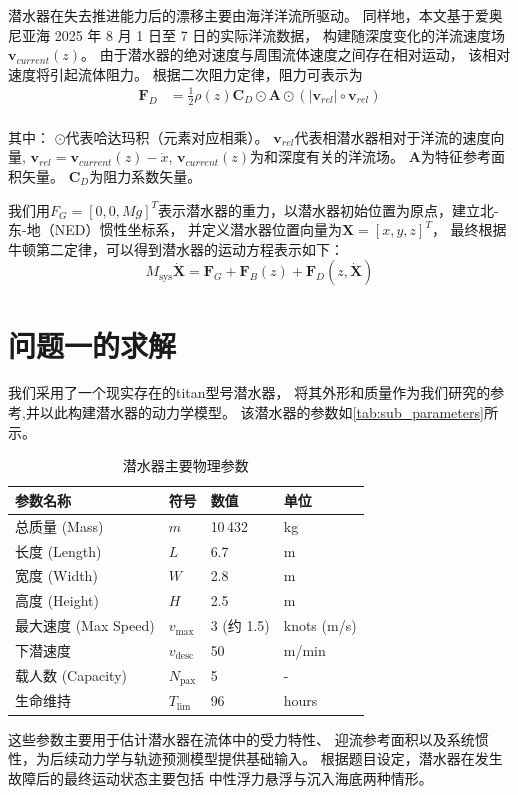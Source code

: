 \documentclass{mcmthesis}
\begin{document}
潜水器在失去推进能力后的漂移主要由海洋洋流所驱动。
同样地，本文基于爱奥尼亚海 2025 年 8 月 1 日至 7 日的实际洋流数据，
构建随深度变化的洋流速度场 $\bm{v}_{current}(z)$。
由于潜水器的绝对速度与周围流体速度之间存在相对运动，
该相对速度将引起流体阻力。
根据二次阻力定律，阻力可表示为
\begin{equation}
  \begin{matrix}\bm{F}_D&=\frac{1}{2}\rho(z)\mathbf{C}_D\odot\mathbf{A}\odot(|\mathbf{v}_{rel}|\circ\mathbf{v}_{rel})\\\end{matrix}
\end{equation}

其中：
$\odot$代表哈达玛积（元素对应相乘）。
$\mathbf{v}_{rel}$代表相潜水器相对于洋流的速度向量,
$\mathbf{v}_{rel}=\bm{v}_{current}(z)-\dot{x}$,
$\bm{v}_{current}(z)$为和深度有关的洋流场。
$\mathbf{A}$为特征参考面积矢量。
$\mathbf{C}_D$为阻力系数矢量。

我们用$F_G=[0,0,Mg]^T$表示潜水器的重力，以潜水器初始位置为原点，建立北-东-地（NED）惯性坐标系，
并定义潜水器位置向量为$\bm{X}=[x,y,z]^T$，
最终根据牛顿第二定律，可以得到潜水器的运动方程表示如下：
\begin{equation}
M_{\mathrm{sys}}\dot{\bm{X}} = \bm{F}_{G} + \bm{F}_{B}(z) + \bm{F}_{D}({z},\dot{\bm{X}}) 
\end{equation}


\section{问题一的求解}
我们采用了一个现实存在的titan型号潜水器，
将其外形和质量作为我们研究的参考,并以此构建潜水器的动力学模型。
该潜水器的参数如\autoref{tab:sub_parameters}所示。
\begin{table}[htbp]
\centering
\caption{潜水器主要物理参数}
\vspace{-0.4cm}
\label{tab:sub_parameters}
\begin{tabularx}{\linewidth}{XXXX}
\toprule
参数名称 & 符号 & 数值 & 单位 \\
\midrule
总质量 (Mass) & $m$ & 10\,432 & kg \\
长度 (Length) & $L$ & 6.7 & m \\
宽度 (Width) & $W$ & 2.8 & m \\
高度 (Height) & $H$ & 2.5 & m \\
最大速度 (Max Speed) & $v_{\max}$ & 3 (约 1.5) & knots (m/s)  \\
下潜速度  & $v_{\text{desc}}$ & 50 & m/min \\
载人数 (Capacity) & $N_{\text{pax}}$ & 5 &  - \\
生命维持  & $T_{\text{lim}}$ & 96 & hours \\
\bottomrule
\end{tabularx}
\end{table}
这些参数主要用于估计潜水器在流体中的受力特性、
迎流参考面积以及系统惯性，为后续动力学与轨迹预测模型提供基础输入。
根据题目设定，潜水器在发生故障后的最终运动状态主要包括
中性浮力悬浮与沉入海底两种情形。
\end{document}
